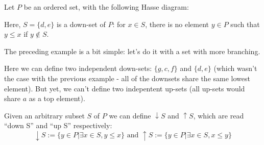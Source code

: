 \begin{example}
Let $P$ be an ordered set, with the following Hasse diagram:
\begin{center}
\end{center}

Here, $S = \{d,e\}$ is a down-set of $P$: for $x \in S$, there is no element $y \in P$ such that $y \leq x$ if $y \notin S$.

The preceding example is a bit simple: let's do it with a set with more branching.

\begin{center}
\end{center}

Here we can define two independent down-sets: $\{g,c,f\}$ and $\{d,e\}$ (which wasn't the case with the previous example - all of the downsets share the same lowest element). But yet, we can't define two indepentent up-sets (all up-sets would share $a$ as a top element).
\end{example}


\begin{definition}
Given an arbitrary subset $S$ of $P$ we can define $\downarrow S$ and $\uparrow S$, which are read ``down S'' and ``up S'' respectively:
\begin{equation*}
\downarrow S := \{ y \in P | \exists x \in S, y \leq x \} \text{ and } \uparrow S := \{ y \in P | \exists x \in S, x \leq y \}
\end{equation*}
\end{definition}

